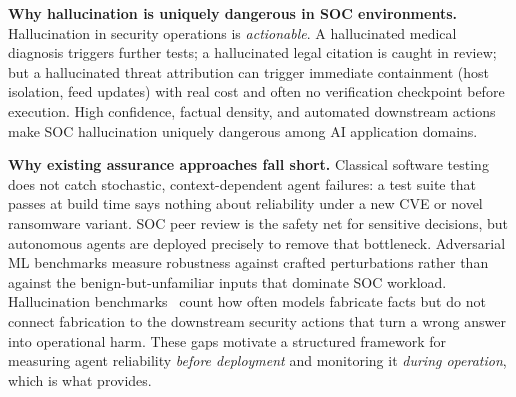 \textbf{Why hallucination is uniquely dangerous in SOC environments.}
Hallucination in security operations is \textit{actionable}. A hallucinated
medical diagnosis triggers further tests; a hallucinated legal citation is
caught in review; but a hallucinated threat attribution can trigger immediate
containment (host isolation, feed updates) with real cost and often no
verification checkpoint before execution. High confidence, factual density,
and automated downstream actions make SOC hallucination uniquely dangerous
among AI application domains.

\textbf{Why existing assurance approaches fall short.}
Classical software testing does not catch stochastic, context-dependent
agent failures: a test suite that passes at build time says nothing about
reliability under a new CVE or novel ransomware variant. SOC peer review
is the safety net for sensitive decisions, but autonomous agents are
deployed precisely to remove that bottleneck. Adversarial ML benchmarks
measure robustness against crafted perturbations rather than against the
benign-but-unfamiliar inputs that dominate SOC workload. Hallucination
benchmarks~\cite{bang2025hallulens} count how often models fabricate
facts but do not connect fabrication to the downstream security actions
that turn a wrong answer into operational harm. These gaps motivate a
structured framework for measuring agent reliability \textit{before
deployment} and monitoring it \textit{during operation}, which is what
\ARES{} provides.
